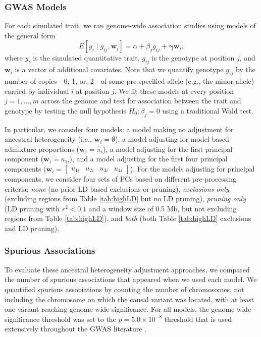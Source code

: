 \documentclass[12pt]{article}
\begin{document}
\subsubsection{GWAS Models}

For each simulated trait, we ran genome-wide association studies using models of the general form
$$E[y_i \mid g_{ij}, \mathbf{w}_i] = \alpha + \beta_j g_{ij} + \boldsymbol\gamma \mathbf{w}_i,$$
where $y_i$ is the simulated quantitative trait, $g_{ij}$ is the genotype at position $j$,  and $\mathbf{w}_i$ is a vector of additional covariates.
Note that we quantify genotype $g_{ij}$ by the number of copies---0, 1, or, 2---of some pre-specified allele (e.g., the minor allele) carried by individual $i$ at position $j$.
We fit these models at every position $j = 1, \dots, m$ across the genome and test for association between the trait and genotype by testing the null hypothesis $H_0: \beta_j = 0$ using a traditional Wald test.

In particular, we consider four models: a model making no adjustment for ancestral heterogeneity (i.e., $\mathbf{w}_i = \emptyset$), a model adjusting for model-based admixture proportions ($\mathbf{w}_i = \hat\pi_i$), a model adjusting for the first principal component ($\mathbf{w}_i = u_{1i}$), and a model adjusting for the first four principal components ($\mathbf{w}_i = \begin{bmatrix} u_{1i} & u_{2i} & u_{3i} & u_{4i} \end{bmatrix}$). 
For the models adjusting for principal components, we consider four sets of PCs based on different pre-processing criteria: \textit{none} (no prior LD-based exclusions or pruning), \textit{exclusions only} (excluding regions from Table \ref{tab:highLD} but no LD pruning), \textit{pruning only} (LD pruning with $r^2 < 0.1$ and a window size of 0.5 Mb, but not excluding regions from Table \ref{tab:highLD}), and \textit{both} (both Table \ref{tab:highLD} exclusions and LD pruning).

\subsubsection{Spurious Associations}

To evaluate these ancestral heterogeneity adjustment approaches, we compared the number of spurious associations that appeared when we used each model.
We quantified spurious associations by counting the number of chromosomes, not including the chromosome on which the causal variant was located, with at least one variant reaching genome-wide significance.
For all models, the genome-wide significance threshold was set to the $p = 5.0 \times 10^{-8}$ threshold that is used extensively throughout the GWAS literature \cite{peer2008, jannot2015}.
\end{document}
